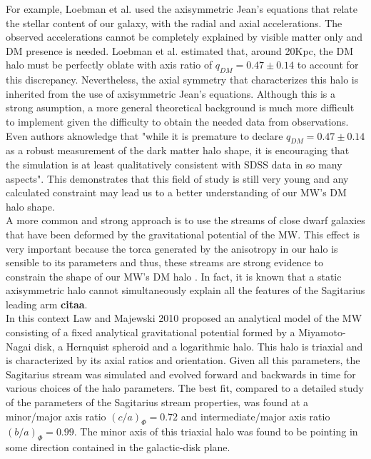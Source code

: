 For example, Loebman et al. \cite{Loebman et al 2012} used the axisymmetric Jean's equations \cite{Jean 2015} that relate the stellar content of our galaxy, with the radial and axial accelerations. The observed accelerations cannot be completely explained by visible matter only and DM presence is needed. Loebman et al. estimated that, around 20Kpc, the DM halo must be perfectly oblate with axis ratio of $q_{DM}=0.47 \pm 0.14$ to account for this discrepancy. Nevertheless, the axial symmetry that characterizes this halo is inherited from the use of axisymmetric Jean's equations. Although this is a strong asumption, a more general theoretical background is much more difficult to implement given the difficulty to obtain the needed data from observations. Even authors aknowledge that "while it is premature to declare $q_{DM}=0.47 \pm 0.14$ as a robust measurement of the dark matter halo shape, it is encouraging that the simulation is at least qualitatively consistent with SDSS data in so many aspects". This demonstrates that this field of study is still very young and any calculated constraint may lead us to a better understanding of our MW's DM halo shape.\\

A more common and strong approach is to use the streams of close dwarf galaxies that have been deformed by the gravitational potential of the MW. This effect is very important because the torca generated by the anisotropy in our halo is sensible to its parameters and thus, these streams are strong evidence to constrain the shape of our MW's DM halo \cite{See Law-Majewski references}. In fact, it is known that a static axisymmetric halo cannot simultaneously explain all the features of the Sagitarius leading arm \textbf{citaa}. \\

In this context Law and Majewski 2010 proposed an analytical model of the MW consisting of a fixed analytical gravitational potential formed by a Miyamoto-Nagai \cite{Miyamoto-Nagai 1985} disk, a Hernquist spheroid and a logarithmic halo. This halo is triaxial and is characterized by its axial ratios and orientation. Given all this parameters, the Sagitarius stream was simulated and evolved forward and backwards in time for various choices of the halo parameters. The best fit, compared to a detailed study of the parameters of the Sagitarius stream properties, was found at a minor/major axis ratio $(c/a)_{\Phi}=0.72$ and intermediate/major axis ratio $(b/a)_{\Phi}=0.99$. The minor axis of this triaxial halo was found to be pointing in some direction contained in the galactic-disk plane. \\


